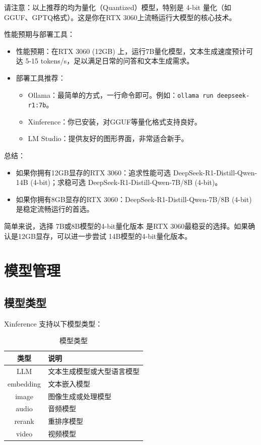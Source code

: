 \documentclass[12pt,UTF8]{ctexbook}
\begin{document}
请注意：以上推荐的均为量化（Quantized）模型，特别是 4-bit 量化（如GGUF、GPTQ格式）。这是你在RTX 3060上流畅运行大模型的核心技术。

性能预期与部署工具：

\begin{itemize}[leftmargin=2cm]
    \item 性能预期：在RTX 3060 (12GB) 上，运行7B量化模型，文本生成速度预计可达 5-15 tokens/s，足以满足日常的问答和文本生成需求。
    \item 部署工具推荐：
        \begin{itemize}[leftmargin=1cm]
            \item Ollama：最简单的方式，一行命令即可。例如：\texttt{ollama run deepseek-r1:7b}。
            \item Xinference：你已安装，对GGUF等量化格式支持良好。
            \item LM Studio：提供友好的图形界面，非常适合新手。
        \end{itemize}
\end{itemize}

总结：

\begin{itemize}[leftmargin=2cm]
    \item 如果你拥有12GB显存的RTX 3060：追求性能可选 DeepSeek-R1-Distill-Qwen-14B (4-bit)；求稳可选 DeepSeek-R1-Distill-Qwen-7B/8B (4-bit)。
    \item 如果你拥有8GB显存的RTX 3060：DeepSeek-R1-Distill-Qwen-7B/8B (4-bit) 是稳定流畅运行的首选。
\end{itemize}

简单来说，选择 7B或8B模型的4-bit量化版本 是RTX 3060最稳妥的选择。如果确认是12GB显存，可以进一步尝试 14B模型的4-bit量化版本。

\chapter{模型管理}
\label{chap:model_management}

\section{模型类型}
\label{sec:model_types}

Xinference 支持以下模型类型：

\begin{table}[htbp]
    \centering
    \caption{模型类型}
    \begin{tabular}{|c|p{8cm}|}
        \hline
        \textbf{类型} & \textbf{说明} \\
        \hline
        LLM & 文本生成模型或大型语言模型 \\
        \hline
        embedding & 文本嵌入模型 \\
        \hline
        image & 图像生成或处理模型 \\
        \hline
        audio & 音频模型 \\
        \hline
        rerank & 重排序模型 \\
        \hline
        video & 视频模型 \\
        \hline
    \end{tabular}
\end{table}
\end{document}
